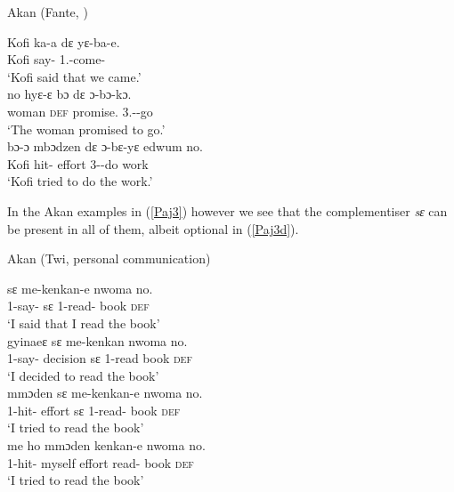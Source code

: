 \documentclass[output=paper]{langscibook}
\begin{document}
\begin{exe}
\ex Akan (Fante, \citealt{osam1998})

\begin{xlist}

\ex \label{Paj2a} 
\gll Kofi ka-a {d{ɛ}} {yɛ-ba-e}.\\
    Kofi say-{\compl} {\comp} 1{\pl}.{\subj}-come-{\compl}\\
\glt `Kofi said that we came.’\\

\ex \label{Paj2b}
 {no} {hy{ɛ}-{ɛ} b{ɔ}} {d{ɛ}} {{ɔ}-b{ɔ}-k{ɔ}}.\\
    woman \textsc{def} promise.{\compl} {\comp} 3{\sg}.{\subj}-{\fut}-go\\
\glt `The woman promised to go.’\\

\ex \label{Paj2c}
 {b{ɔ}-ɔ} {mb{ɔ}dzen} {d{ɛ}} {ɔ-bɛ-yɛ} {edwum} {no}.	\\
    Kofi hit-{\compl} effort {\comp} 3{\sg}-{\fut}-do work \\
\glt `Kofi tried to do the work.’\\

\end{xlist}
\end{exe}
 

In the Akan examples in (\ref{Paj3}) however we see that the complementiser \textit{sɛ} can be present in all of them, albeit optional in (\ref{Paj3d}). 

\begin{exe}
\ex \label{Paj3} Akan (Twi, personal communication)

\begin{xlist}

\ex \label{Paj3a}
 {s{ɛ}} {me-kenkan-e} {nwoma} {no.}\\
    1{\sg}-say-{\compl} s{ɛ} 1{\sg}-read-{\compl} book \textsc{def} \\
\glt `I said that I read the book’\\

\ex \label{Paj3b}
 {gyinae{ɛ}} {s{ɛ}} {me-kenkan} {nwoma} {no.}\\
     1{\sg}-say-{\compl} decision s{ɛ} 1{\sg}-read book \textsc{def}\\
\glt `I decided to read the book’\\

\ex \label{Paj3c}
 {mm{ɔ}den} {s{ɛ}} {me-kenkan-e} {nwoma} {no.}\\
     1{\sg}-hit-{\compl} effort s{ɛ} 1{\sg}-read-{\compl} book \textsc{def}\\
\glt `I tried to read the book’\\

\ex \label{Paj3d}
 {me ho} {mm{ɔ}den} {kenkan-e} {nwoma} {no.}\\
     1{\sg}-hit-{\compl} myself effort read-{\compl} book \textsc{def}\\
\glt `I tried to read the book’\\

\end{xlist}
\end{exe}
 
\end{document}
